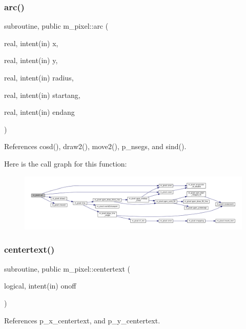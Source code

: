 \subsubsection{\texorpdfstring{arc()}{arc()}}
{\footnotesize\ttfamily subroutine, public m\+\_\+pixel\+::arc (\begin{DoxyParamCaption}\item[{real, intent(in)}]{x,  }\item[{real, intent(in)}]{y,  }\item[{real, intent(in)}]{radius,  }\item[{real, intent(in)}]{startang,  }\item[{real, intent(in)}]{endang }\end{DoxyParamCaption})}



References cosd(), draw2(), move2(), p\+\_\+nsegs, and sind().

Here is the call graph for this function\+:
\nopagebreak
\begin{figure}[H]
\begin{center}
\leavevmode
\includegraphics[width=350pt]{namespacem__pixel_ab881b9c2adff081a086cd83a1f1341fb_cgraph}
\end{center}
\end{figure}
\mbox{\label{namespacem__pixel_a9ddc8e8604bbc3181c728f08a6b87904}} 
\subsubsection{\texorpdfstring{centertext()}{centertext()}}
{\footnotesize\ttfamily subroutine, public m\+\_\+pixel\+::centertext (\begin{DoxyParamCaption}\item[{logical, intent(in)}]{onoff }\end{DoxyParamCaption})}



References p\+\_\+x\+\_\+centertext, and p\+\_\+y\+\_\+centertext.


